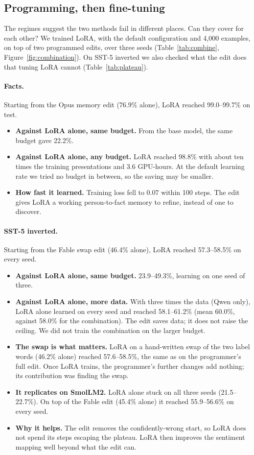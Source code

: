\subsection{Programming, then fine-tuning}
\label{sec:combine}
The regimes suggest the two methods fail in different places. Can they cover for each other? We trained LoRA, with the default configuration and 4,000 examples, on top of two programmed edits, over three seeds (Table~\ref{tab:combine}, Figure~\ref{fig:combination}). On SST-5 inverted we also checked what the edit does that tuning LoRA cannot (Table~\ref{tab:plateau}).

\paragraph{Facts.} Starting from the Opus memory edit (76.9\% alone), LoRA reached 99.0--99.7\% on test.
\begin{itemize}
  \item \textbf{Against LoRA alone, same budget.} From the base model, the same budget gave 22.2\%.
  \item \textbf{Against LoRA alone, any budget.} LoRA reached 98.8\% with about ten times the training presentations and 3.6 GPU-hours. At the default learning rate we tried no budget in between, so the saving may be smaller.
  \item \textbf{How fast it learned.} Training loss fell to 0.07 within 100 steps. The edit gives LoRA a working person-to-fact memory to refine, instead of one to discover.
\end{itemize}

\paragraph{SST-5 inverted.} Starting from the Fable swap edit (46.4\% alone), LoRA reached 57.3--58.5\% on every seed.
\begin{itemize}
  \item \textbf{Against LoRA alone, same budget.} 23.9--49.3\%, learning on one seed of three.
  \item \textbf{Against LoRA alone, more data.} With three times the data (Qwen only), LoRA alone learned on every seed and reached 58.1--61.2\% (mean 60.0\%, against 58.0\% for the combination). The edit saves data; it does not raise the ceiling. We did not train the combination on the larger budget.
  \item \textbf{The swap is what matters.} LoRA on a hand-written swap of the two label words (46.2\% alone) reached 57.6--58.5\%, the same as on the programmer's full edit. Once LoRA trains, the programmer's further changes add nothing; its contribution was finding the swap.
  \item \textbf{It replicates on SmolLM2.} LoRA alone stuck on all three seeds (21.5--22.7\%). On top of the Fable edit (45.4\% alone) it reached 55.9--56.6\% on every seed.
  \item \textbf{Why it helps.} The edit removes the confidently-wrong start, so LoRA does not spend its steps escaping the plateau. LoRA then improves the sentiment mapping well beyond what the edit can.
\end{itemize}

